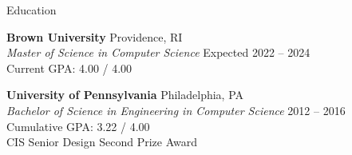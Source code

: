 \documentclass{resume} %
\begin{document}

\begin{grouping}{Education}
    \item {\bf Brown University} \hfill Providence, RI \\
        {\em Master of Science in Computer Science} \hfill Expected 2022 -- 2024 \\
        Current GPA: 4.00 / 4.00

    \item {\bf University of Pennsylvania} \hfill Philadelphia, PA \\
        {\em Bachelor of Science in Engineering in Computer Science} \hfill 2012 -- 2016 \\
        Cumulative GPA: 3.22 / 4.00 \\
        CIS Senior Design Second Prize Award

        \iffalse
            {\em Relevant Courses:}
            \begin{items}
            \item Advanced Topics in Algorithms and Complexity
            \item Internet \& Web Systems
            \item Computer Operating Systems
            \item Introduction to Artificial Intelligence
            \end{items}

        \item {\bf Belmont High School} \hfill Belmont, MA \\
            Cumulative GPA: 3.84 / 4.00 \hfill June 2012
        \fi

\end{grouping}

\end{document}
